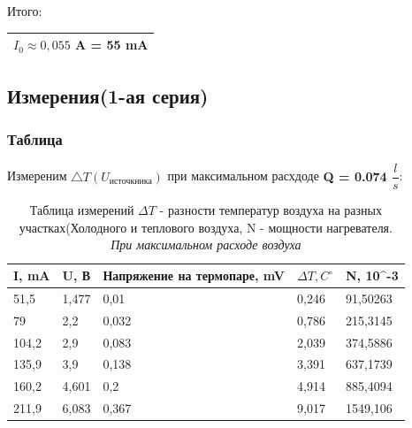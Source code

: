 \documentclass[a4paper,12pt]{article}
\theoremstyle{plain} %
\theoremstyle{definition} %
\theoremstyle{remark} %
\begin{document}
\begin{Large}
Итого:
\end{Large}

\begin{large}
\begin{center}
\begin{tabular}{|c|}
\hline 
$I_0 \approx 0,055$ A = 55 mA\\ 
\hline 
\end{tabular} 
\end{center}
\end{large}

\subsection{Измерения(1-ая серия)}
\subsubsection{Таблица}
\indent Измереним $\triangle T (U_{источкника})$ при максимальном расхдоде
\textbf{\large{Q = 0.074 $\dfrac{l}{s}$}}:

\begin{table}[h]
\centering
\caption{Таблица измерений $\Delta T$ - разности температур воздуха на разных участках(Холодного и теплового воздуха, N - мощности нагревателя. \textit{При максимальном расходе воздуха}}
\label{tab:tab1}
\begin{tabular}{|l|l|l|l|l|}
\hline
I, mA & U, В  & Напряжение на термопаре, mV & $\Delta T, C^\circ$ & N, 10\textasciicircum -3 \\ \hline
51,5  & 1,477 & 0,01                        & 0,246               & 91,50263                 \\
79    & 2,2   & 0,032                       & 0,786               & 215,3145                 \\
104,2 & 2,9   & 0,083                       & 2,039               & 374,5886                 \\
135,9 & 3,9   & 0,138                       & 3,391               & 637,1739                 \\
160,2 & 4,601 & 0,2                         & 4,914               & 885,4094                 \\
211,9 & 6,083 & 0,367                       & 9,017               & 1549,106                 \\ \hline
\end{tabular}
\end{table}
\end{document}
